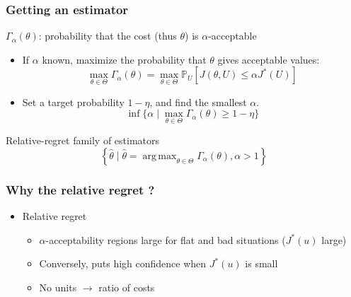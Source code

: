 \documentclass[11pt]{beamer}
\newcommand{\Prob}{\mathbb{P}}
\DeclareMathOperator*{\argmax}{arg\,max}
\newcommand{\kk}{\theta}
\newcommand{\uu}{u}
\newcommand{\UU}{U}
\newcommand{\Kspace}{\Theta}
\newcommand\manupath{/home/victor/acadwriting/Manuscrit/Text/}
\begin{document}
\begin{frame}
  
  \frametitle{Getting an estimator}
  $\Gamma_{\alpha}(\kk)$: probability that the cost (thus $\kk$) is $\alpha$-acceptable
  \begin{itemize}
  \item If $\alpha$ known, maximize the probability that $\kk$ gives acceptable values:
    \begin{equation}
      \max_{\kk\in\Kspace} \Gamma_{\alpha}(\kk) = \max_{\kk\in\Kspace}\Prob_{\UU}\left[J(\kk, \UU) \leq \alpha J^*(\UU)\right]
    \end{equation}
  \item Set a target probability $1-\eta$, and find the smallest $\alpha$.
    \begin{equation}
      \inf\{ \alpha \mid \max_{\kk\in\Kspace}\Gamma_{\alpha}(\kk) \geq 1 - \eta \}
    \end{equation}
  \end{itemize}

  \begin{block}{Relative-regret family of estimators~\citep{trappler_robust_2020}}
  \begin{equation}
   \left\{ \hat{\kk} \mid \hat{\kk} = \argmax_{\kk \in \Kspace} \Gamma_{\alpha}(\kk), \alpha>1 \right\}
  \end{equation}
\end{block}
\end{frame}

\begin{frame}
  \frametitle{Why the relative regret ?}

  
  \renewcommand\rmfamily{\sffamily}
  \begin{center}
  \resizebox{.6\textwidth}{!}{}
\end{center}
  \begin{itemize}
  \item Relative regret
    \begin{itemize}
    \item $\alpha$-acceptability regions large for flat and bad situations ($J^*(\uu)$ large)
    \item Conversely, puts high confidence when $J^*(\uu)$ is small
    \item No units $\rightarrow$ ratio of costs
    \end{itemize}
  \end{itemize}
\end{frame}
\end{document}
